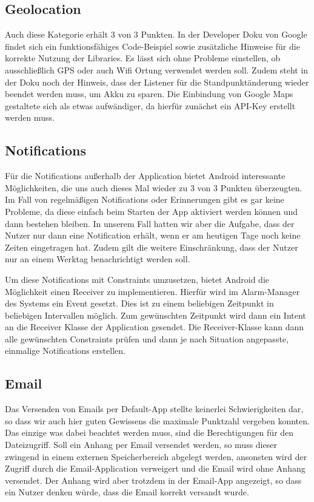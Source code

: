 \subsection{Geolocation}
Auch diese Kategorie erhält 3 von 3 Punkten. In der Developer Doku von Google findet sich ein funktionsfähiges Code-Beispiel sowie zusätzliche Hinweise für die korrekte Nutzung der Libraries. Es lässt sich ohne Probleme einstellen, ob ausschließlich GPS oder auch Wifi Ortung verwendet werden soll. Zudem steht in der Doku noch der Hinweis, dass der Listener für die Standpunktänderung wieder beendet werden muss, um Akku zu sparen. Die Einbindung von Google Maps gestaltete sich als etwas aufwändiger, da hierfür zunächst ein API-Key erstellt werden muss.

\subsection{Notifications}
Für die Notifications außerhalb der Application bietet Android interessante Möglichkeiten, die uns auch dieses Mal wieder zu 3 von 3 Punkten überzeugten. Im Fall von regel\-mäßigen Notifications oder Erinnerungen gibt es gar keine Probleme, da diese einfach beim Starten der App aktiviert werden können und dann bestehen bleiben. In unserem Fall hatten wir aber die Aufgabe, dass der Nutzer nur dann eine Notification erhält, wenn er am heutigen Tage noch keine Zeiten eingetragen hat. Zudem gilt die weitere Einschränkung, dass der Nutzer nur an einem Werktag benachrichtigt werden soll.

Um diese Notifications mit Constraints umzusetzen, bietet Android die Möglichkeit einen Receiver zu implementieren. Hierfür wird im Alarm-Manager des Systems ein Event ge\-setzt. Dies ist zu einem beliebigen Zeitpunkt in beliebigen Intervallen möglich. Zum gewünschten Zeitpunkt wird dann ein Intent an die Receiver Klasse der Application gesendet. Die Receiver-Klasse kann dann alle gewünschten Constraints prü\-fen und dann je nach Situation angepasste, einmalige Notifications erstellen.

\subsection{Email}
Das Versenden von Emails per Default-App stellte keinerlei Schwierigkeiten dar, so dass wir auch hier guten Gewissens die maximale Punktzahl vergeben konnten. Das einzige was dabei beachtet werden muss, sind die Berechtigungen für den Dateizugriff. Soll ein Anhang per Email versendet werden, so muss dieser zwingend in einem externen Speicherbereich abgelegt werden, ansonsten wird der Zugriff durch die Email-Application verweigert und die Email wird ohne Anhang versendet. Der Anhang wird aber trotzdem in der Email-App angezeigt, so dass ein Nutzer denken würde, dass die Email korrekt versandt wurde.

